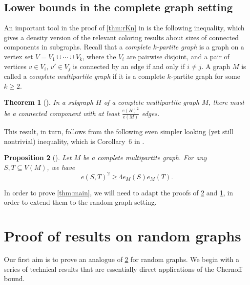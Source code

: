 \documentclass[12pt]{amsart}
\newtheorem{theorem}{Theorem}[section]
\newtheorem{prop}[theorem]{Proposition}
\theoremstyle{definition}
\numberwithin{equation}{section}
\begin{document}
\subsection{Lower bounds in the complete graph setting}

An important tool in the proof of \cref{thm:rKn} in \cite{sluo} is the following inequality, which gives a density version of the relevant coloring results about sizes of connected components in subgraphs. Recall that a \emph{complete $k$-partite graph} is a graph on a vertex set $V=V_1\cup\cdots\cup V_k$, where the $V_i$ are pairwise disjoint, and a pair of vertices $v\in V_i$, $v'\in V_j$ is connected by an edge if and only if $i\neq j$. A graph $M$ is called a \emph{complete multipartite graph} if it is a complete $k$-partite graph for some $k\ge 2$.
\begin{theorem}[\cite{sluo}]
    \label{thm:rpart-comp}
    In a subgraph $H$ of a complete multipartite graph $M$, there must be a connected component 
    with at least $\frac{e(H)^2}{e(M)}$ edges.
\end{theorem}

This result, in turn, follows from the following even simpler looking (yet still nontrivial) inequality, which is Corollary~6 in \cite{sluo}.

\begin{prop}[\cite{sluo}]\label{prop:rpart-cor}
    Let $M$ be a complete multipartite graph. For any $S,T\subseteq V(M)$, we have
    \[
        e(S,T)^2\ge 4e_M(S) e_M(T).
    \]
\end{prop}

In order to prove \cref{thm:main}, we will need to adapt the proofs of \cref{prop:rpart-cor} and \cref{thm:rpart-comp}, in order to extend them to the random graph setting.

\section{Proof of results on random graphs}
\label{sec:Gnp}

Our first aim is to prove an analogue of \cref{prop:rpart-cor} for random graphs.
 We begin with a series of technical results that are essentially direct applications of the Chernoff bound.
\end{document}
